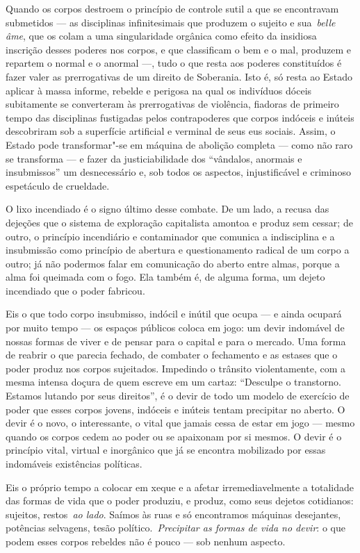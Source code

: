 Quando os corpos destroem o princípio de controle sutil a que se
encontravam submetidos --- as disciplinas infinitesimais que produzem o
sujeito e sua~\emph{belle âme}, que os colam a uma singularidade
orgânica como efeito da insidiosa inscrição desses poderes nos corpos, e
que classificam o bem e o mal, produzem e repartem o normal e o anormal
---, tudo o que resta aos poderes constituídos é fazer valer as
prerrogativas de um direito de Soberania. Isto é, só resta ao Estado
aplicar à massa informe, rebelde e perigosa na qual os indivíduos dóceis
subitamente se converteram às prerrogativas de violência, fiadoras de
primeiro tempo das disciplinas fustigadas pelos contrapoderes que corpos
indóceis e inúteis descobriram sob a superfície artificial e verminal de
seus eus sociais. Assim, o Estado pode transformar"-se em máquina de
abolição completa --- como não raro se transforma --- e fazer da
justiciabilidade dos ``vândalos, anormais e insubmissos'' um
desnecessário e, sob todos os aspectos, injustificável e criminoso
espetáculo de crueldade.

O lixo incendiado é o signo último desse combate. De um lado, a recusa
das dejeções que o sistema de exploração capitalista amontoa e produz
sem cessar; de outro, o princípio incendiário e contaminador que
comunica a indisciplina e a insubmissão como princípio de abertura e
questionamento radical de um corpo a outro; já não podermos falar em
comunicação do aberto entre almas, porque a alma foi queimada com o
fogo. Ela também é, de alguma forma, um dejeto incendiado que o poder
fabricou.

Eis o que todo corpo insubmisso, indócil e inútil que ocupa --- e ainda
ocupará por muito tempo --- os espaços públicos coloca em jogo: um devir
indomável de nossas formas de viver e de pensar para o capital e para o
mercado. Uma forma de reabrir o que parecia fechado, de combater o
fechamento e as estases que o poder produz nos corpos sujeitados.
Impedindo o trânsito violentamente, com a mesma intensa doçura de quem
escreve em um cartaz: ``Desculpe o transtorno. Estamos lutando por seus
direitos'', é o devir de todo um modelo de exercício de poder que esses
corpos jovens, indóceis e inúteis tentam precipitar no aberto. O devir é
o novo, o interessante, o vital que jamais cessa de estar em jogo ---
mesmo quando os corpos cedem ao poder ou se apaixonam por si mesmos. O
devir é o princípio vital, virtual e inorgânico que já se encontra
mobilizado por essas indomáveis existências políticas.

Eis o próprio tempo a colocar em xeque e a afetar irremediavelmente a
totalidade das formas de vida que o poder produziu, e produz, como seus
dejetos cotidianos: sujeitos, restos~\emph{ao lado}. Saímos às ruas e só
encontramos máquinas desejantes, potências selvagens, tesão
político.~\emph{Precipitar as formas de vida no devir}: o que podem
esses corpos rebeldes não é pouco --- sob nenhum aspecto.

